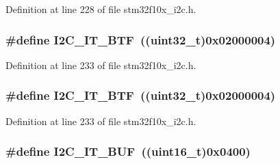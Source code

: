 Definition at line 228 of file stm32f10x\+\_\+i2c.\+h.

\subsubsection[{\texorpdfstring{I2\+C\+\_\+\+I\+T\+\_\+\+B\+TF}{I2C_IT_BTF}}]{\setlength{\rightskip}{0pt plus 5cm}\#define I2\+C\+\_\+\+I\+T\+\_\+\+B\+TF~(({\bf uint32\+\_\+t})0x02000004)}\hypertarget{group___i2_c__interrupts__definition_gaef469fef934f655614b7cffd00b87ceb}{}\label{group___i2_c__interrupts__definition_gaef469fef934f655614b7cffd00b87ceb}


Definition at line 233 of file stm32f10x\+\_\+i2c.\+h.

\subsubsection[{\texorpdfstring{I2\+C\+\_\+\+I\+T\+\_\+\+B\+TF}{I2C_IT_BTF}}]{\setlength{\rightskip}{0pt plus 5cm}\#define I2\+C\+\_\+\+I\+T\+\_\+\+B\+TF~(({\bf uint32\+\_\+t})0x02000004)}\hypertarget{group___i2_c__interrupts__definition_gaef469fef934f655614b7cffd00b87ceb}{}\label{group___i2_c__interrupts__definition_gaef469fef934f655614b7cffd00b87ceb}


Definition at line 233 of file stm32f10x\+\_\+i2c.\+h.

\subsubsection[{\texorpdfstring{I2\+C\+\_\+\+I\+T\+\_\+\+B\+UF}{I2C_IT_BUF}}]{\setlength{\rightskip}{0pt plus 5cm}\#define I2\+C\+\_\+\+I\+T\+\_\+\+B\+UF~(({\bf uint16\+\_\+t})0x0400)}\hypertarget{group___i2_c__interrupts__definition_gad3ff3f405b882aa4d2f91310aa1cc0df}{}\label{group___i2_c__interrupts__definition_gad3ff3f405b882aa4d2f91310aa1cc0df}



